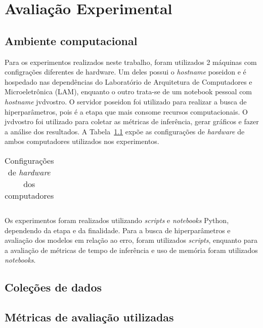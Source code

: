 \chapter{Avaliação Experimental}
\section{Ambiente computacional}
Para os experimentos realizados neste trabalho, foram utilizados 2 máquinas com configrações diferentes de hardware. Um deles possui o \textit{hostname} poseidon e é hospedado nas dependências do Laboratório de Arquitetura de Computadores e Microeletrônica (LAM), enquanto o outro trata-se de um notebook pessoal com \textit{hostname} jvdvostro. O servidor poseidon foi utilizado para realizar a busca de hiperparâmetros, pois é a etapa que mais consome recursos computacionais. O jvdvostro foi utilizado para coletar as métricas de inferência, gerar gráficos e fazer a análise dos resultados. A Tabela~\ref{tab:hardware} expõe as configurações de \textit{hardware} de ambos computadores utilizados nos experimentos.

\begin{table}[!htp]\centering \label{tab:hardware}
    \caption{Configurações de \textit{hardware} dos computadores}
    \begin{tabular}{lrrrrr}\toprule
    \end{tabular}
\end{table}

Os experimentos foram realizados utilizando \textit{scripts} e \textit{notebooks} Python, dependendo da etapa e da finalidade. Para a busca de hiperparâmetros e avaliação dos modelos em relação ao erro, foram utilizados \textit{scripts}, enquanto para a avaliação de métricas de tempo de inferência e uso de memória foram utilizados \textit{notebooks}.

\section{Coleções de dados}



\section{Métricas de avaliação utilizadas}

